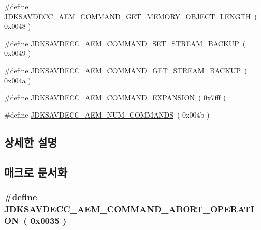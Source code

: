 \begin{DoxyCompactItemize}
\item 
\#define \hyperlink{group__command_ga6f73403dcbcc32f1680d55948694b29f}{J\+D\+K\+S\+A\+V\+D\+E\+C\+C\+\_\+\+A\+E\+M\+\_\+\+C\+O\+M\+M\+A\+N\+D\+\_\+\+G\+E\+T\+\_\+\+M\+E\+M\+O\+R\+Y\+\_\+\+O\+B\+J\+E\+C\+T\+\_\+\+L\+E\+N\+G\+TH}~( 0x0048 )
\item 
\#define \hyperlink{group__command_ga25304c69ae50ab79fe37ecfe7a795b6f}{J\+D\+K\+S\+A\+V\+D\+E\+C\+C\+\_\+\+A\+E\+M\+\_\+\+C\+O\+M\+M\+A\+N\+D\+\_\+\+S\+E\+T\+\_\+\+S\+T\+R\+E\+A\+M\+\_\+\+B\+A\+C\+K\+UP}~( 0x0049 )
\item 
\#define \hyperlink{group__command_ga9331b5820e763e151cb071c8340eb003}{J\+D\+K\+S\+A\+V\+D\+E\+C\+C\+\_\+\+A\+E\+M\+\_\+\+C\+O\+M\+M\+A\+N\+D\+\_\+\+G\+E\+T\+\_\+\+S\+T\+R\+E\+A\+M\+\_\+\+B\+A\+C\+K\+UP}~( 0x004a )
\item 
\#define \hyperlink{group__command_ga87c8f5ae46b7fece4aab67fb3fa18a2f}{J\+D\+K\+S\+A\+V\+D\+E\+C\+C\+\_\+\+A\+E\+M\+\_\+\+C\+O\+M\+M\+A\+N\+D\+\_\+\+E\+X\+P\+A\+N\+S\+I\+ON}~( 0x7fff )
\item 
\#define \hyperlink{group__command_ga2a4cac63d94c9b2cd9789395545d0148}{J\+D\+K\+S\+A\+V\+D\+E\+C\+C\+\_\+\+A\+E\+M\+\_\+\+N\+U\+M\+\_\+\+C\+O\+M\+M\+A\+N\+DS}~( 0x004b )
\end{DoxyCompactItemize}


\subsection{상세한 설명}


\subsection{매크로 문서화}
\subsubsection[{\texorpdfstring{J\+D\+K\+S\+A\+V\+D\+E\+C\+C\+\_\+\+A\+E\+M\+\_\+\+C\+O\+M\+M\+A\+N\+D\+\_\+\+A\+B\+O\+R\+T\+\_\+\+O\+P\+E\+R\+A\+T\+I\+ON}{JDKSAVDECC_AEM_COMMAND_ABORT_OPERATION}}]{\setlength{\rightskip}{0pt plus 5cm}\#define J\+D\+K\+S\+A\+V\+D\+E\+C\+C\+\_\+\+A\+E\+M\+\_\+\+C\+O\+M\+M\+A\+N\+D\+\_\+\+A\+B\+O\+R\+T\+\_\+\+O\+P\+E\+R\+A\+T\+I\+ON~( 0x0035 )}\hypertarget{group__command_ga9ac9b4714b2f11976edeee84eff5dc80}{}\label{group__command_ga9ac9b4714b2f11976edeee84eff5dc80}


